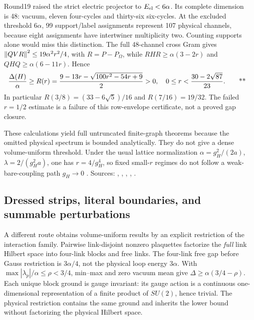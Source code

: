 Round19 raised the strict electric projector to \(E_{\rm el}<6\alpha\).
Its complete dimension is 48: vacuum, eleven four-cycles and thirty-six
six-cycles. At the excluded threshold \(6\alpha\), 99 support/label
assignments represent 107 physical channels, because eight assignments
have intertwiner multiplicity two. Counting supports alone would miss
this distinction. The full 48-channel cross Gram gives
\(\left\lVert QVR\right\rVert^2\le19\alpha^2r^2/4\), with \(R=P-P_\Omega\), while
\(RHR\ge\alpha(3-2r)\) and \(QHQ\ge\alpha(6-11r)\). Hence
\begin{equation}
 \frac{\Delta(H)}{\alpha}\ge
 R(r)=\frac{9-13r-\sqrt{100r^2-54r+9}}2>0,
 \quad
 0\le r<\frac{30-2\sqrt{87}}{23}.
 \qquad\text{**}
 \label{eq:middle-48gap}
\end{equation}
In particular \(R(3/8)=(33-6\sqrt5)/16\) and \(R(7/16)=19/32\).
The failed \(r=1/2\) estimate is a failure of this row-envelope
certificate, not a proved gap closure.

These calculations yield full untruncated finite-graph theorems because
the omitted physical spectrum is bounded analytically. They do not give a
dense volume-uniform threshold. Under the usual lattice normalization
\(\alpha=g_H^2/(2a)\), \(\lambda=2/(g_H^2a)\), one has
\(r=4/g_H^4\), so fixed small-\(r\) regimes do not follow a
weak-bare-coupling path \(g_H\to0\) \cite{bauer2023basis}.
Sources:
,
,
,
,
.

\subsection{Dressed strips, literal boundaries, and summable perturbations \workstar}
\label{sec:middle-strips}

A different route obtains volume-uniform results by an explicit restriction
of the interaction family. Pairwise link-disjoint nonzero plaquettes
factorize the \emph{full} link Hilbert space into four-link blocks and free
links. The four-link free gap before Gauss restriction is \(3\alpha/4\),
not the physical loop energy \(3\alpha\). With
\(\max|\lambda_p|/\alpha\le\rho<3/4\), min--max and zero vacuum mean give
\(\Delta\ge\alpha(3/4-\rho)\). Each unique block ground is gauge invariant:
its gauge action is a continuous one-dimensional representation of a finite
product of \(SU(2)\), hence trivial. The physical restriction contains the
same ground and inherits the lower bound without factorizing the physical
Hilbert space.

